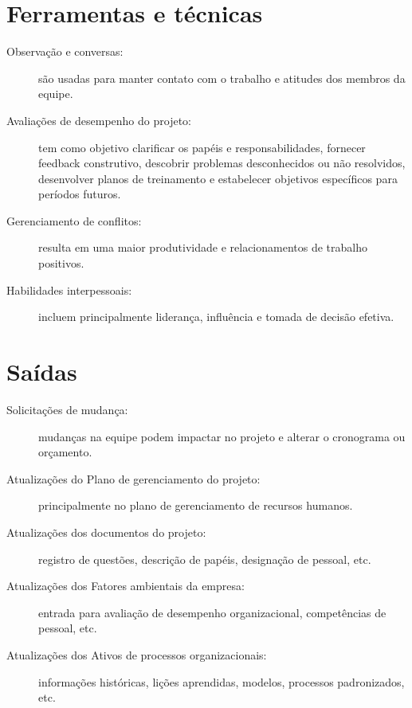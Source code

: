 \section{Ferramentas e técnicas}

\begin{description}

	\item[Observação e conversas:] são usadas para manter contato com o trabalho e atitudes dos membros da equipe.
	
	\item[Avaliações de desempenho do projeto:] tem como objetivo clarificar os papéis e responsabilidades, fornecer feedback construtivo, descobrir problemas desconhecidos ou não resolvidos, desenvolver planos de treinamento e estabelecer objetivos específicos para períodos futuros.
	
	\item[Gerenciamento de conflitos:] resulta em uma maior produtividade e relacionamentos de trabalho positivos.
	
	\item[Habilidades interpessoais:] incluem principalmente liderança, influência e tomada de decisão efetiva.
		
\end{description}

\section{Saídas}

\begin{description}

	\item[Solicitações de mudança:] mudanças na equipe podem impactar no projeto e alterar o cronograma ou orçamento.
	
	\item[Atualizações do Plano de gerenciamento do projeto:] principalmente no plano de gerenciamento de recursos humanos.
	
	\item[Atualizações dos documentos do projeto:] registro de questões, descrição de papéis, designação de pessoal, etc.
	
	\item[Atualizações dos Fatores ambientais da empresa:] entrada para avaliação de desempenho organizacional, competências de pessoal, etc.
	
	\item[Atualizações dos Ativos de processos organizacionais:] informações históricas, lições aprendidas, modelos, processos padronizados, etc.
	
	
\end{description}